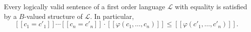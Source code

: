 Every logically valid sentence of a first order language $\mathcal{L}$ with equality is satisfied by a $B$-valued structure of $\mathcal{L}$. In particular,
$$[\![c_1 = c'_1]\!] \cdots [\![c_n = c'_n]\!] \cdot [\![\varphi(c_1, \ldots, c_n)]\!] \leq [\![\varphi(c'_1, \ldots, c'_n)]\!].$$
